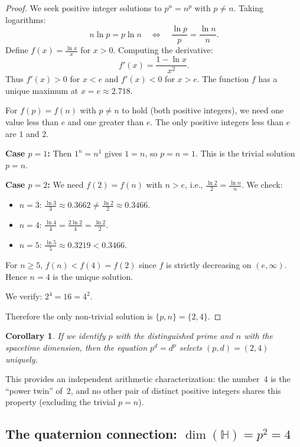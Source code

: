 \documentclass[12pt,a4paper]{article}
\newtheorem{corollary}[theorem]{Corollary}
\theoremstyle{definition}
\newcommand{\HH}{\mathbb{H}}
\begin{document}
\begin{proof}
We seek positive integer solutions to $p^n = n^p$ with $p \neq n$. Taking logarithms:
\[
  n \ln p = p \ln n \quad \Longleftrightarrow \quad \frac{\ln p}{p} = \frac{\ln n}{n}.
\]
Define $f(x) = \frac{\ln x}{x}$ for $x > 0$. Computing the derivative:
\[
  f'(x) = \frac{1 - \ln x}{x^2}.
\]
Thus $f'(x) > 0$ for $x < e$ and $f'(x) < 0$ for $x > e$. The function $f$ has a
unique maximum at $x = e \approx 2.718$.

For $f(p) = f(n)$ with $p \neq n$ to hold (both positive integers), we need one value
less than $e$ and one greater than $e$. The only positive integers less than $e$ are
$1$ and $2$.

\textbf{Case $p = 1$:} Then $1^n = n^1$ gives $1 = n$, so $p = n = 1$. This is the
trivial solution $p = n$.

\textbf{Case $p = 2$:} We need $f(2) = f(n)$ with $n > e$, i.e.,
$\frac{\ln 2}{2} = \frac{\ln n}{n}$. We check:
\begin{itemize}
  \item $n = 3$: $\frac{\ln 3}{3} \approx 0.3662 \neq \frac{\ln 2}{2} \approx 0.3466$.
  \item $n = 4$: $\frac{\ln 4}{4} = \frac{2\ln 2}{4} = \frac{\ln 2}{2}$. \checkmark
  \item $n = 5$: $\frac{\ln 5}{5} \approx 0.3219 < 0.3466$.
\end{itemize}
For $n \geq 5$, $f(n) < f(4) = f(2)$ since $f$ is strictly decreasing on $(e, \infty)$.
Hence $n = 4$ is the unique solution.

We verify: $2^4 = 16 = 4^2$. \checkmark

Therefore the only non-trivial solution is $\{p, n\} = \{2, 4\}$.
\end{proof}

\begin{corollary}\label{cor:d_from_pn}
If we identify $p$ with the distinguished prime and $n$ with the spacetime dimension,
then the equation $p^d = d^p$ selects $(p, d) = (2, 4)$ uniquely.
\end{corollary}

This provides an independent arithmetic characterization: the number~4 is the
``power twin'' of~2, and no other pair of distinct positive integers shares this
property (excluding the trivial $p = n$).

\subsection{The quaternion connection: $\dim(\HH) = p^2 = 4$}
\end{document}
